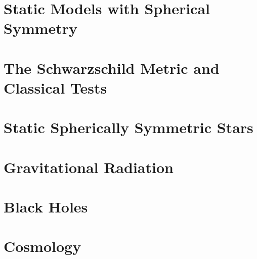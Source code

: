 \documentclass{momento}
\begin{document}
\chapter{Static Models with Spherical Symmetry}
\label{cha:static-models-with}


\chapter{The Schwarzschild Metric and Classical Tests}
\label{cha:schw-metr-class}


\chapter{Static Spherically Symmetric Stars}
\label{cha:einst-equat-stat}


\chapter{Gravitational Radiation}
\label{cha:grav-radi}



\chapter{Black Holes}
\label{cha:black-holes}

\chapter{Cosmology}
\label{cha:cosmology}



\appendices
\end{document}
